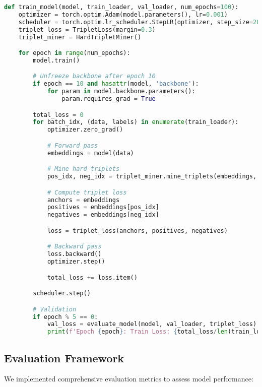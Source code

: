 \begin{lstlisting}[language=Python, caption=Training Loop with Progressive Unfreezing]
def train_model(model, train_loader, val_loader, num_epochs=100):
    optimizer = torch.optim.Adam(model.parameters(), lr=0.001)
    scheduler = torch.optim.lr_scheduler.StepLR(optimizer, step_size=20, gamma=0.5)
    triplet_loss = TripletLoss(margin=0.3)
    triplet_miner = HardTripletMiner()

    for epoch in range(num_epochs):
        model.train()

        # Unfreeze backbone after epoch 10
        if epoch == 10 and hasattr(model, 'backbone'):
            for param in model.backbone.parameters():
                param.requires_grad = True

        total_loss = 0
        for batch_idx, (data, labels) in enumerate(train_loader):
            optimizer.zero_grad()

            # Forward pass
            embeddings = model(data)

            # Mine hard triplets
            pos_idx, neg_idx = triplet_miner.mine_triplets(embeddings, labels)

            # Compute triplet loss
            anchors = embeddings
            positives = embeddings[pos_idx]
            negatives = embeddings[neg_idx]

            loss = triplet_loss(anchors, positives, negatives)

            # Backward pass
            loss.backward()
            optimizer.step()

            total_loss += loss.item()

        scheduler.step()

        # Validation
        if epoch % 5 == 0:
            val_loss = evaluate_model(model, val_loader, triplet_loss)
            print(f'Epoch {epoch}: Train Loss: {total_loss/len(train_loader):.4f}, Val Loss: {val_loss:.4f}')
\end{lstlisting}

\subsection{Evaluation Framework}

We implemented comprehensive evaluation metrics to assess model performance:

